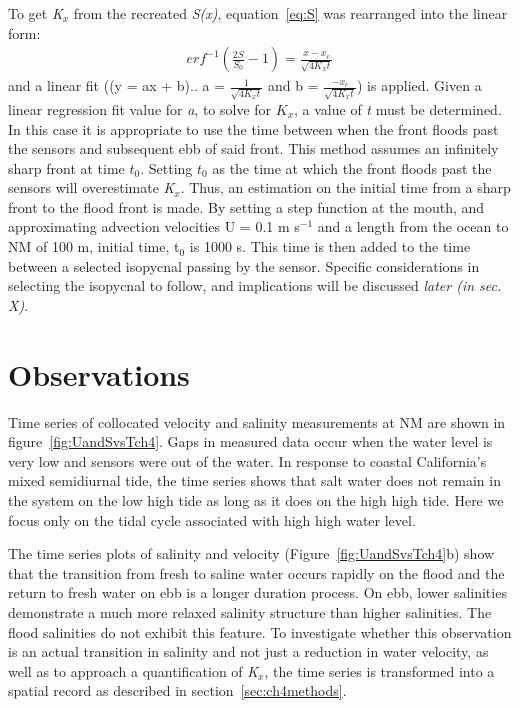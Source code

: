 To get \emph{K$_x$} from the recreated \emph{S(x)}, equation~\ref{eq:S} was rearranged into the linear form:
\begin{eqnarray}
erf^{-1}\left(\frac{2S}{S_0}-1\right) = \frac{x-x_c}{\sqrt{4K_xt}} \label{eq:linfitS}
\end{eqnarray}
and a linear fit ((y = ax + b).. a = $\frac{1}{\sqrt{4K_xt}}$ and b = $\frac{-x_c}{\sqrt{4K_xt}}$) is applied. Given a linear regression fit value for \emph{a}, to solve for $K_x$, a value of \emph{t} must be determined. In this case it is appropriate to use the time between when the front floods past the sensors and subsequent ebb of said front. This method assumes an infinitely sharp front at time $t_0$. Setting $t_0$ as the time at which the front floods past the sensors will overestimate \emph{K$_x$}. Thus, an estimation on the initial time from a sharp front to the flood front is made. By setting a step function at the mouth, and approximating advection velocities U = 0.1 m s$^{-1}$ and a length from the ocean to NM of 100 m, initial time, t$_0$ is 1000 s. This time is then added to the time between a selected isopycnal passing by the sensor. Specific considerations in selecting the isopycnal to follow, and implications will be discussed \emph{later (in sec. X)}. 



\section{Observations} \label{sec:ObsCh4}
Time series of collocated velocity and salinity measurements at NM are shown in figure~\ref{fig:UandSvsTch4}. Gaps in measured data occur when the water level is very low and sensors were out of the water. In response to coastal California's mixed semidiurnal tide, the time series shows that salt water does not remain in the system on the low high tide as long as it does on the high high tide. Here we focus only on the tidal cycle associated with high high water level. 

The time series plots of salinity and velocity (Figure~\ref{fig:UandSvsTch4}b) show that the transition from fresh to saline water occurs rapidly on the flood and the return to fresh water on ebb is a longer duration process. On ebb, lower salinities demonstrate a much more relaxed salinity structure than higher salinities. The flood salinities do not exhibit this feature. To investigate whether this observation is an actual transition in salinity and not just a reduction in water velocity, as well as to approach a quantification of \emph{K$_x$}, the time series is transformed into a spatial record as described in section~\ref{sec:ch4methods}. 

